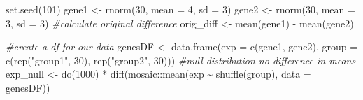 \documentclass[
]{article}
\newenvironment{Shaded}{\begin{snugshade}}{\end{snugshade}}
\newcommand{\AttributeTok}[1]{\textcolor[rgb]{0.77,0.63,0.00}{#1}}
\newcommand{\CommentTok}[1]{\textcolor[rgb]{0.56,0.35,0.01}{\textit{#1}}}
\newcommand{\DecValTok}[1]{\textcolor[rgb]{0.00,0.00,0.81}{#1}}
\newcommand{\FunctionTok}[1]{\textcolor[rgb]{0.00,0.00,0.00}{#1}}
\newcommand{\NormalTok}[1]{#1}
\newcommand{\OtherTok}[1]{\textcolor[rgb]{0.56,0.35,0.01}{#1}}
\newcommand{\SpecialCharTok}[1]{\textcolor[rgb]{0.00,0.00,0.00}{#1}}
\newcommand{\StringTok}[1]{\textcolor[rgb]{0.31,0.60,0.02}{#1}}
\begin{document}
\begin{Shaded}
\begin{Highlighting}[]
\FunctionTok{set.seed}\NormalTok{(}\DecValTok{101}\NormalTok{)}
\NormalTok{gene1 }\OtherTok{\textless{}{-}} \FunctionTok{rnorm}\NormalTok{(}\DecValTok{30}\NormalTok{, }\AttributeTok{mean =} \DecValTok{4}\NormalTok{, }\AttributeTok{sd =} \DecValTok{3}\NormalTok{)}
\NormalTok{gene2 }\OtherTok{\textless{}{-}} \FunctionTok{rnorm}\NormalTok{(}\DecValTok{30}\NormalTok{, }\AttributeTok{mean =} \DecValTok{3}\NormalTok{, }\AttributeTok{sd =} \DecValTok{3}\NormalTok{)}
\CommentTok{\#calculate original difference}
\NormalTok{orig\_diff }\OtherTok{\textless{}{-}} \FunctionTok{mean}\NormalTok{(gene1) }\SpecialCharTok{{-}} \FunctionTok{mean}\NormalTok{(gene2)}


\CommentTok{\#create a df for our data}
\NormalTok{genesDF }\OtherTok{\textless{}{-}} \FunctionTok{data.frame}\NormalTok{(}\AttributeTok{exp =} \FunctionTok{c}\NormalTok{(gene1, gene2), }\AttributeTok{group =} \FunctionTok{c}\NormalTok{(}\FunctionTok{rep}\NormalTok{(}\StringTok{"group1"}\NormalTok{, }\DecValTok{30}\NormalTok{), }\FunctionTok{rep}\NormalTok{(}\StringTok{"group2"}\NormalTok{, }\DecValTok{30}\NormalTok{)))}
\CommentTok{\#null distribution{-}no difference in means }
\NormalTok{exp\_null }\OtherTok{\textless{}{-}} \FunctionTok{do}\NormalTok{(}\DecValTok{1000}\NormalTok{) }\SpecialCharTok{*} \FunctionTok{diff}\NormalTok{(mosaic}\SpecialCharTok{::}\FunctionTok{mean}\NormalTok{(exp }\SpecialCharTok{\textasciitilde{}} \FunctionTok{shuffle}\NormalTok{(group), }\AttributeTok{data =}\NormalTok{ genesDF))}


\end{Highlighting}
\end{Shaded}
\end{document}
